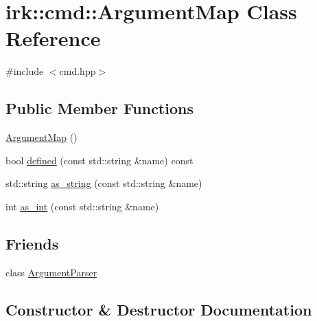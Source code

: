 \hypertarget{classirk_1_1cmd_1_1ArgumentMap}{}\section{irk\+:\+:cmd\+:\+:Argument\+Map Class Reference}
\label{classirk_1_1cmd_1_1ArgumentMap}


{\ttfamily \#include $<$cmd.\+hpp$>$}

\subsection*{Public Member Functions}
\begin{DoxyCompactItemize}
\item 
\mbox{\hyperlink{classirk_1_1cmd_1_1ArgumentMap_a9e4cf1870e143efd4d8f928b3054dcad}{Argument\+Map}} ()
\item 
bool \mbox{\hyperlink{classirk_1_1cmd_1_1ArgumentMap_a32d9361a13e2420d4d4ae8cd19fcf8d7}{defined}} (const std\+::string \&name) const
\item 
std\+::string \mbox{\hyperlink{classirk_1_1cmd_1_1ArgumentMap_a11986847959703d2390b85118342837d}{as\+\_\+string}} (const std\+::string \&name)
\item 
int \mbox{\hyperlink{classirk_1_1cmd_1_1ArgumentMap_acf51abb8670b32047edf8e804103bdfa}{as\+\_\+int}} (const std\+::string \&name)
\end{DoxyCompactItemize}
\subsection*{Friends}
\begin{DoxyCompactItemize}
\item 
class \mbox{\hyperlink{classirk_1_1cmd_1_1ArgumentMap_a55c9e1ac006a645af402e3aee6b64e00}{Argument\+Parser}}
\end{DoxyCompactItemize}


\subsection{Constructor \& Destructor Documentation}
\mbox{\label{classirk_1_1cmd_1_1ArgumentMap_a9e4cf1870e143efd4d8f928b3054dcad}} 
